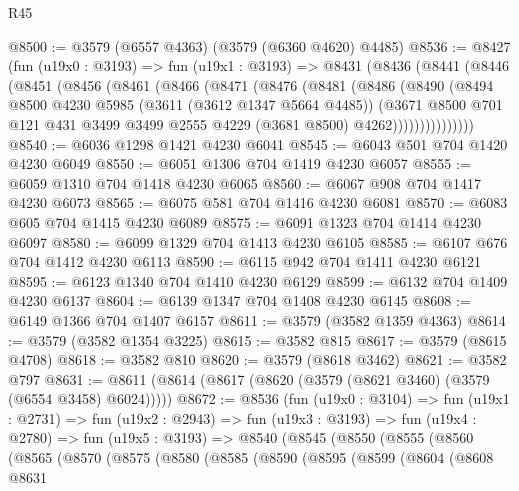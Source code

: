 \begin{lexlean}{R45}
\begin{coremodule}
@8500 := @3579 (@6557 @4363) (@3579 (@6360 @4620) @4485)
@8536 := @8427
    (fun (u19x0 : @3193) =>
    fun (u19x1 : @3193) =>
    @8431
      (@8436
        (@8441
          (@8446
            (@8451
              (@8456
                (@8461
                  (@8466
                    (@8471
                      (@8476
                        (@8481
                          (@8486
                            (@8490
                              (@8494
                                @8500
                                @4230
                                @5985
                                (@3611 (@3612 @1347 @5664 @4485))
                                (@3671
                                  @8500
                                  @701
                                  @121
                                  @431
                                  @3499
                                  @3499
                                  @2555
                                  @4229
                                  (@3681 @8500)
                                  @4262)))))))))))))))
@8540 := @6036 @1298 @1421 @4230 @6041
@8545 := @6043 @501 @704 @1420 @4230 @6049
@8550 := @6051 @1306 @704 @1419 @4230 @6057
@8555 := @6059 @1310 @704 @1418 @4230 @6065
@8560 := @6067 @908 @704 @1417 @4230 @6073
@8565 := @6075 @581 @704 @1416 @4230 @6081
@8570 := @6083 @605 @704 @1415 @4230 @6089
@8575 := @6091 @1323 @704 @1414 @4230 @6097
@8580 := @6099 @1329 @704 @1413 @4230 @6105
@8585 := @6107 @676 @704 @1412 @4230 @6113
@8590 := @6115 @942 @704 @1411 @4230 @6121
@8595 := @6123 @1340 @704 @1410 @4230 @6129
@8599 := @6132 @704 @1409 @4230 @6137
@8604 := @6139 @1347 @704 @1408 @4230 @6145
@8608 := @6149 @1366 @704 @1407 @6157
@8611 := @3579 (@3582 @1359 @4363)
@8614 := @3579 (@3582 @1354 @3225)
@8615 := @3582 @815
@8617 := @3579 (@8615 @4708)
@8618 := @3582 @810
@8620 := @3579 (@8618 @3462)
@8621 := @3582 @797
@8631 := @8611 (@8614 (@8617 (@8620 (@3579 (@8621 @3460) (@3579 (@6554 @3458) @6024)))))
@8672 := @8536
    (fun (u19x0 : @3104) =>
    fun (u19x1 : @2731) =>
    fun (u19x2 : @2943) =>
    fun (u19x3 : @3193) =>
    fun (u19x4 : @2780) =>
    fun (u19x5 : @3193) =>
    @8540
      (@8545
        (@8550
          (@8555
            (@8560
              (@8565
                (@8570
                  (@8575
                    (@8580
                      (@8585
                        (@8590
                          (@8595
                            (@8599
                              (@8604
                                (@8608
                                  @8631

\end{coremodule}
\end{lexlean}
